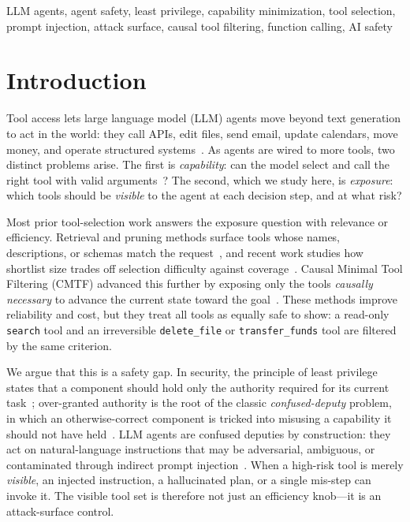 \documentclass[conference,onecolumn]{IEEEtran}
\begin{document}
\begin{IEEEkeywords}
LLM agents, agent safety, least privilege, capability minimization, tool selection, prompt injection, attack surface, causal tool filtering, function calling, AI safety
\end{IEEEkeywords}

\section{Introduction}
Tool access lets large language model (LLM) agents move beyond text generation to act in the world: they call APIs, edit files, send email, update calendars, move money, and operate structured systems~\cite{yao2022react,schick2023toolformer,qin2023toollm}. As agents are wired to more tools, two distinct problems arise. The first is \emph{capability}: can the model select and call the right tool with valid arguments~\cite{patil2024bfcl,li2023apibank}? The second, which we study here, is \emph{exposure}: which tools should be \emph{visible} to the agent at each decision step, and at what risk?

Most prior tool-selection work answers the exposure question with relevance or efficiency. Retrieval and pruning methods surface tools whose names, descriptions, or schemas match the request~\cite{shi2025toolret,gan2025ragmcp,liu2025toolscope}, and recent work studies how shortlist size trades off selection difficulty against coverage~\cite{repantis2026howmanytools}. Causal Minimal Tool Filtering (CMTF) advanced this further by exposing only the tools \emph{causally necessary} to advance the current state toward the goal~\cite{anon2026cmtf}. These methods improve reliability and cost, but they treat all tools as equally safe to show: a read-only \texttt{search} tool and an irreversible \texttt{delete\_file} or \texttt{transfer\_funds} tool are filtered by the same criterion.

We argue that this is a safety gap. In security, the principle of least privilege states that a component should hold only the authority required for its current task~\cite{saltzer1975protection}; over-granted authority is the root of the classic \emph{confused-deputy} problem, in which an otherwise-correct component is tricked into misusing a capability it should not have held~\cite{hardy1988confused}. LLM agents are confused deputies by construction: they act on natural-language instructions that may be adversarial, ambiguous, or contaminated through indirect prompt injection~\cite{greshake2023injection}. When a high-risk tool is merely \emph{visible}, an injected instruction, a hallucinated plan, or a single mis-step can invoke it. The visible tool set is therefore not just an efficiency knob---it is an attack-surface control.
\end{document}
